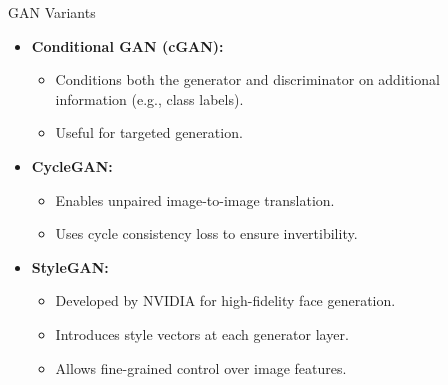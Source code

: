 \begin{frame}[allowframebreaks]{GAN Variants}
\begin{itemize}
        \item \textbf{Conditional GAN (cGAN):} 
        \begin{itemize}
            \item Conditions both the generator and discriminator on additional information (e.g., class labels).
            \item Useful for targeted generation.
        \end{itemize}
        \item \textbf{CycleGAN:} 
        \begin{itemize}
            \item Enables unpaired image-to-image translation.
            \item Uses cycle consistency loss to ensure invertibility.
        \end{itemize}
        \item \textbf{StyleGAN:} 
        \begin{itemize}
            \item Developed by NVIDIA for high-fidelity face generation.
            \item Introduces style vectors at each generator layer.
            \item Allows fine-grained control over image features.
        \end{itemize}
    \end{itemize}
\end{frame}





